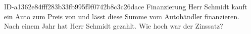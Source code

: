 \begin{exercise}
      {ID-a1362e84fff283b33fb995f9f0742b8c3c26dace}
      {Finanzierung}
  \ifproblem\problem
    Herr Schmidt kauft ein Auto zum Preis von  und lässt diese
    Summe vom Autohändler finanzieren. Nach einem Jahr hat Herr Schmidt
     gezahlt. Wie hoch war der Zinssatz?
  \fi
\end{exercise}

